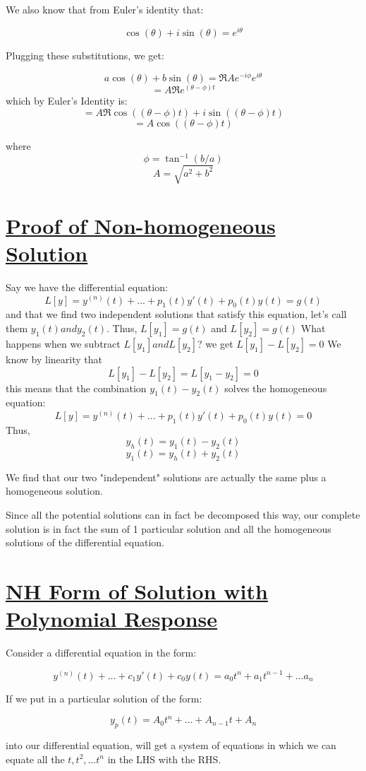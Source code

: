\documentclass{report}
\begin{document}
We also know that from Euler's identity that:

$$\cos(\theta) + i\sin(\theta) = e^{i\theta}$$

Plugging these substitutions, we get:

$$a\cos(\theta) + b\sin(\theta) = \Re{Ae^{-i\phi}e^{i\theta}}$$
$$=A\Re{e^{(\theta-\phi)t}}$$
which by Euler's Identity is:
$$=A\Re{\cos((\theta-\phi)t)+i\sin((\theta-\phi)t)}$$
$$=A\cos((\theta-\phi)t)$$

where 
$$\phi = \tan^{-1}(b/a)$$
$$A = \sqrt{a^2+b^2}$$




\section{\hyperref[th:nhSol]{Proof of Non-homogeneous Solution}}
\label{sec:prNhSol}
Say we have the differential equation:
 $$L[y] = y^{(n)}(t) + ... + p_1(t)y'(t) + p_0(t)y(t) = g(t)$$
and that we find two independent solutions that satisfy this equation, let's call them $y_1(t) and y_2(t)$.
Thus, $L[y_1]=g(t)$ and $L[y_2]=g(t)$
What happens when we subtract $L[y_1] and L[y_2]$?
we get $L[y_1]-L[y_2] = 0$
We know by linearity that 
$$L[y_1]-L[y_2] = L[y_1-y_2] = 0$$
this means that the combination $y_1(t)-y_2(t)$ solves the homogeneous equation:
$$L[y] = y^{(n)}(t) + ... + p_1(t)y'(t) + p_0(t)y(t) = 0$$
Thus,
$$y_h(t) = y_1(t)-y_2(t)$$
$$y_1(t) = y_h(t) + y_2(t)$$

We find that our two "independent" solutions are actually the same plus a homogeneous solution.

Since all the potential solutions can in fact be decomposed this way, our complete solution is in fact the sum of 1 particular solution and all the homogeneous solutions of the differential equation.


\section{\hyperref[th:polyResp]{NH Form of Solution with Polynomial Response}}
\label{sec:prPolyResp}
Consider a differential equation in the form:

$$y^{(n)}(t) + \dots + c_1y'(t) + c_0y(t) = a_0t^n + a_1t^{n-1} + \dots a_n$$

If we put in a particular solution of the form:

$$y_p(t) = A_0t^n + \dots + A_{n-1}t + A_n$$

into our differential equation, will get a system of equations in which we can equate all the $t, t^2, \dots t^n$ in the LHS with the RHS.
\end{document}
